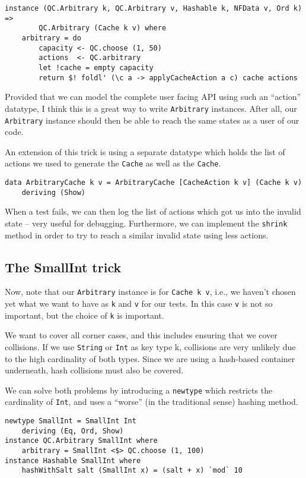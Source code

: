 \begin{verbatim}
instance (QC.Arbitrary k, QC.Arbitrary v, Hashable k, NFData v, Ord k) =>
        QC.Arbitrary (Cache k v) where
    arbitrary = do
        capacity <- QC.choose (1, 50)
        actions  <- QC.arbitrary
        let !cache = empty capacity
        return $! foldl' (\c a -> applyCacheAction a c) cache actions
\end{verbatim}
Provided that we can model the complete user facing API using such an ``action'' datatype, I think this is a great way to write \texttt{Arbitrary} instances. After all, our \texttt{Arbitrary} instance should then be able to reach the same states as a user of our code.

An extension of this trick is using a separate datatype which holds the list of actions we used to generate the \texttt{Cache} as well as the \texttt{Cache}.

\begin{verbatim}
data ArbitraryCache k v = ArbitraryCache [CacheAction k v] (Cache k v)
    deriving (Show)
\end{verbatim}
When a test fails, we can then log the list of actions which got us into the invalid state -- very useful for debugging. Furthermore, we can implement the \texttt{shrink} method in order to try to reach a similar invalid state using less actions.

\subsection{The SmallInt trick}


Now, note that our \texttt{Arbitrary} instance is for \texttt{Cache k v}, i.e., we haven't chosen yet what we want to have as \texttt{k} and \texttt{v} for our tests. In this case \texttt{v} is not so important, but the choice of \texttt{k} is important.

We want to cover all corner cases, and this includes ensuring that we cover collisions. If we use \texttt{String} or \texttt{Int} as key type k, collisions are very unlikely due to the high cardinality of both types. Since we are using a hash-based container underneath, hash collisions must also be covered.

We can solve both problems by introducing a \texttt{newtype} which restricts the cardinality of \texttt{Int}, and uses a ``worse'' (in the traditional sense) hashing method.

\begin{verbatim}
newtype SmallInt = SmallInt Int
    deriving (Eq, Ord, Show)
instance QC.Arbitrary SmallInt where
    arbitrary = SmallInt <$> QC.choose (1, 100)
instance Hashable SmallInt where
    hashWithSalt salt (SmallInt x) = (salt + x) `mod` 10
\end{verbatim}

